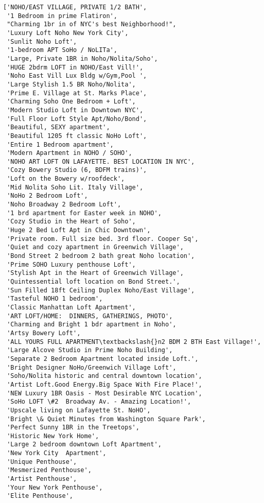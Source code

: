 \documentclass[11pt]{article}
\makeatletter
\newcommand{\boxspacing}{\kern\kvtcb@left@rule\kern\kvtcb@boxsep}
\newcommand{\prompt}[4]{
        {\ttfamily\llap{{\color{#2}[#3]:\hspace{3pt}#4}}\vspace{-\baselineskip}}
    }
\makeatother
\begin{document}
            \begin{tcolorbox}[breakable, size=fbox, boxrule=.5pt, pad at break*=1mm, opacityfill=0]
\prompt{Out}{outcolor}{279}{\boxspacing}
\begin{Verbatim}[commandchars=\\\{\}]
['NOHO/EAST VILLAGE, PRIVATE 1/2 BATH',
 '1 Bedroom in prime Flatiron',
 "Charming 1br in of NYC's best Neighborhood!",
 'Luxury Loft Noho New York City',
 'Sunlit Noho Loft',
 '1-bedroom APT SoHo / NoLITa',
 'Large, Private 1BR in Noho/Nolita/Soho',
 'HUGE 2bdrm LOFT in NOHO/East Vill!',
 'Noho East Vill Lux Bldg w/Gym,Pool ',
 'Large Stylish 1.5 BR Noho/Nolita',
 'Prime E. Village at St. Marks Place',
 'Charming Soho One Bedroom + Loft',
 'Modern Studio Loft in Downtown NYC',
 'Full Floor Loft Style Apt/Noho/Bond',
 'Beautiful, SEXY apartment',
 'Beautiful 1205 ft classic NoHo Loft',
 'Entire 1 Bedroom apartment',
 'Modern Apartment in NOHO / SOHO',
 'NOHO ART LOFT ON LAFAYETTE. BEST LOCATION IN NYC',
 'Cozy Bowery Studio (6, BDFM trains)',
 'Loft on the Bowery w/roofdeck',
 'Mid Nolita Soho Lit. Italy Village',
 'NoHo 2 Bedroom Loft',
 'Noho Broadway 2 Bedroom Loft',
 '1 brd apartment for Easter week in NOHO',
 'Cozy Studio in the Heart of Soho',
 'Huge 2 Bed Loft Apt in Chic Downtown',
 'Private room. Full size bed. 3rd floor. Cooper Sq',
 'Quiet and cozy apartment in Greenwich Village',
 'Bond Street 2 bedroom 2 bath great Noho location',
 'Prime SOHO Luxury penthouse Loft',
 'Stylish Apt in the Heart of Greenwich Village',
 'Quintessential loft location on Bond Street.',
 'Sun Filled 18ft Ceiling Duplex Noho/East Village',
 'Tasteful NOHO 1 bedroom',
 'Classic Manhattan Loft Apartment',
 'ART LOFT/HOME:  DINNERS, GATHERINGS, PHOTO',
 'Charming and Bright 1 bdr apartment in Noho',
 'Artsy Bowery Loft',
 'ALL YOURS FULL APARTMENT\textbackslash{}n2 BDM 2 BTH East Village!',
 'Large Alcove Studio in Prime Noho Building',
 'Separate 2 Bedroom Apartment located inside Loft.',
 'Bright Designer NoHo/Greenwich Village Loft',
 'Soho/Nolita historic and central downtown location',
 'Artist Loft.Good Energy.Big Space With Fire Place!',
 'NEW Luxury 1BR Oasis - Most Desirable NYC Location',
 'SoHo LOFT \#2  Broadway Av. - Amazing Location!',
 'Upscale living on Lafayette St. NoHO',
 'Bright \& Quiet Minutes from Washington Square Park',
 'Perfect Sunny 1BR in the Treetops',
 'Historic New York Home',
 'Large 2 bedroom downtown Loft Apartment',
 'New York City  Apartment',
 'Unique Penthouse',
 'Mesmerized Penthouse',
 'Artist Penthouse',
 'Your New York Penthouse',
 'Elite Penthouse',

\end{Verbatim}
\end{tcolorbox}
\end{document}
